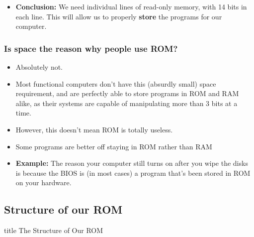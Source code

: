 \documentclass{beamer}
\begin{document}
\begin{frame}
\begin{itemize}

    				\item \textbf{Conclusion:} We need individual lines of read-only memory, with 14 bits in each line. This will allow us to properly \textbf{store} the programs for our computer.
    			
    			\end{itemize}
    			
    		\end{frame}
    		
    		\begin{frame}
    			\frametitle{Is space the reason why people use ROM?}
    			\begin{itemize}
    				\item Absolutely not.
    				\item Most functional computers don't have this (absurdly small) space requirement, and are perfectly able to store programs in ROM and RAM alike, as their systems are capable of manipulating more than 3 bits at a time.
    				\item However, this doesn't mean ROM is totally useless.
    				\item Some programs are better off staying in ROM rather than RAM
    				\item \textbf{Example:} The reason your computer still turns on after you wipe the disks is because the BIOS is (in most cases) a program that's been stored in ROM on your hardware.
    			
    			\end{itemize}
    			
    		\end{frame}
    		
    		
    		
    		
    	\subsection{Structure of our ROM}
    	
    		\begin{frame}
                \vfill
                \centering
                \begin{beamercolorbox}[sep=8pt,center,shadow=true,rounded=true]{title}
                    The Structure of Our ROM\par%
                \end{beamercolorbox}
                \vfill
             \end{frame}
             
\end{document}
